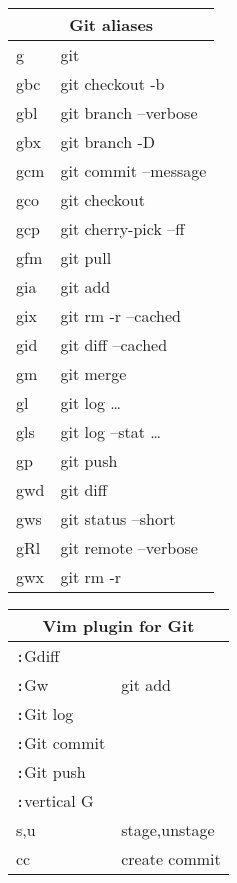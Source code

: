 \documentclass[12pt,paper=landscape,paper=a4]{scrartcl}
\begin{document}
\pagestyle{empty}

\begin{multicols}{3}

    \begin{tabular}{ll}
        \multicolumn{2}{c}{Git aliases} \\
        \hline
        g    & git\\
        gbc  & git checkout -b\\
        gbl  & git branch --verbose\\
        gbx  & git branch -D\\
        gcm  & git commit --message\\
        gco  & git checkout\\
        gcp  & git cherry-pick --ff\\
        gfm  & git pull\\
        gia  & git add\\
        gix  & git rm -r --cached\\
        gid  & git diff --cached\\
        gm   & git merge\\
        gl   & git log \ldots\\
        gls  & git log --stat \ldots\\
        gp   & git push\\
        gwd  & git diff\\
        gws  & git status --short\\
        gRl  & git remote --verbose\\
        gwx  & git rm -r
    \end{tabular}

    \vspace{1em}

    \begin{tabular}{ll}
        \multicolumn{2}{c}{Vim plugin for Git}\\
        \hline
        \verb!:!Gdiff          & \\
        \verb!:!Gw             & git add\\
        \verb!:!Git log        & \\
        \verb!:!Git commit     & \\
        \verb!:!Git push       & \\
        \verb!:!vertical G     & \\
        s,u  	        & stage,unstage\\
        cc		        & create commit\\
    \end{tabular}


\end{multicols}
\end{document}
